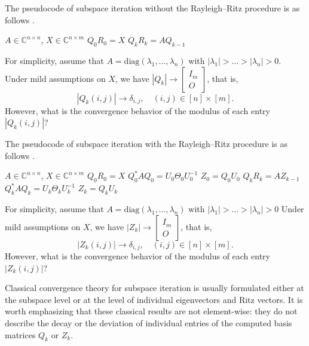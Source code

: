 \documentclass[11pt,a4paper]{article}
\theoremstyle{plain}              %
\theoremstyle{definition}         %
\begin{document}
The pseudocode of subspace iteration without the Rayleigh--Ritz procedure is as follows \cite{saad_book}.

\begin{algorithm}[H]
\caption{Subspace iteration without the Rayleigh--Ritz procedure}
\begin{algorithmic}[1]
\Require \(A\in\mathbb{C}^{n\times n}\), \(X\in\mathbb{C}^{n\times m}\)
\State \(Q_0R_0=X\)
\State \(Q_kR_k=AQ_{k-1}\)
\EndFor
\end{algorithmic}
\end{algorithm}

For simplicity, assume that \(A=\mathrm{diag}(\lambda_1,\dots,\lambda_n)\) with \(|\lambda_1|>\dots>|\lambda_n|>0\). Under mild assumptions on \(X\), we have \(|Q_k|\to\begin{bmatrix}
	I_m\\
	O
\end{bmatrix}\), that is,
\[
|Q_k(i,j)|\to\delta_{i,j},\quad (i,j)\in[n]\times[m].
\]
However, what is the convergence behavior of the modulus of each entry \(|Q_k(i,j)|\)?

The pseudocode of subspace iteration with the Rayleigh--Ritz procedure is as follows \cite{saad_book}.

\begin{algorithm}[H]
\caption{Subspace iteration with the Rayleigh--Ritz procedure}
\begin{algorithmic}[1]
\Require \(A\in\mathbb{C}^{n\times n}\), \(X\in\mathbb{C}^{n\times m}\)
\State \(Q_0R_0=X\)
\State \(Q_0^*AQ_0=U_0\Theta_0U_0^{-1}\)
\State \(Z_0=Q_0U_0\)
\State \(Q_kR_k=AZ_{k-1}\)
\State \(Q_k^*AQ_k=U_k\Theta_kU_k^{-1}\)
\State \(Z_k=Q_kU_k\)
\EndFor
\end{algorithmic}
\end{algorithm}

For simplicity, assume that \(A=\mathrm{diag}(\lambda_1,\dots,\lambda_n)\) with \(|\lambda_1|>\dots>|\lambda_n|>0\) Under mild assumptions on \(X\), we have \(|Z_k|\to\begin{bmatrix}
	I_m\\
	O
\end{bmatrix}\), that is,
\[
|Z_k(i,j)|\to\delta_{i,j},\quad (i,j)\in[n]\times[m].
\]
However, what is the convergence behavior of the modulus of each entry \(|Z_k(i,j)|\)?

Classical convergence theory for subspace iteration is usually formulated either at the subspace level or at the level of individual eigenvectors and Ritz vectors. It is worth emphasizing that these classical results are not element-wise: they do not describe the decay or the deviation of individual entries of the computed basis matrices \(Q_k\) or \(Z_k\).
\end{document}
